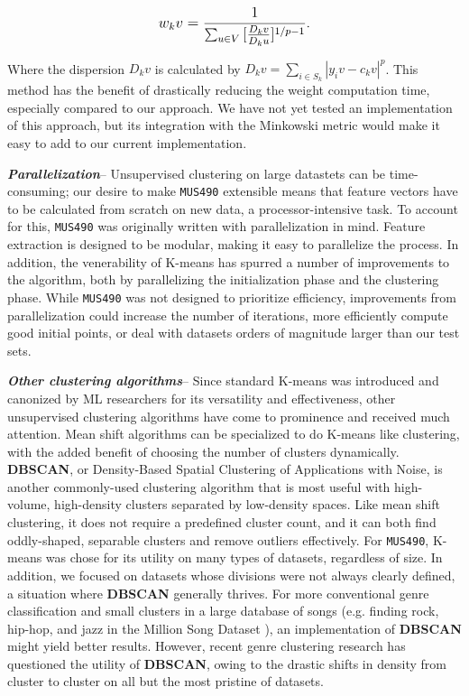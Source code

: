 \documentclass[12pt,twocolumn,titlepage]{article}
\begin{document}
\begin{equation}\label{}
\mathlarger{w_kv = \frac{1}{\sum_{u \in V}{}{[\frac{D_kv}{D_ku}]^{1 / p-1}}}}.
\end{equation}

Where the dispersion $D_kv$ is calculated by $D_kv = \sum_{i \in S_k}{}{|y_iv - c_kv|^p}$. This method has the benefit of drastically reducing the weight computation time, especially compared to our approach. We have not yet tested an implementation of this approach, but its integration with the Minkowski metric would make it easy to add to our current implementation.

\emph{\textbf{Parallelization}}-- Unsupervised clustering on large datastets can be time-consuming; our desire to make \texttt{MUS490} extensible means that feature vectors have to be calculated from scratch on new data, a processor-intensive task. To account for this, \texttt{MUS490} was originally written with parallelization in mind. Feature extraction is designed to be modular, making it easy to parallelize the process. In addition, the venerability of K-means has spurred a number of improvements to the algorithm, both by parallelizing the initialization phase \cite{KMeans++} and the clustering phase. \cite{ParallelK} While \texttt{MUS490} was not designed to prioritize efficiency, improvements from parallelization could increase the number of iterations, more efficiently compute good initial points, or deal with datasets orders of magnitude larger than our test sets.

\emph{\textbf{Other clustering algorithms}}-- Since standard K-means was introduced and canonized by ML researchers for its versatility and effectiveness, other unsupervised clustering algorithms have come to prominence and received much attention. Mean shift algorithms can be specialized to do K-means like clustering, with the added benefit of choosing the number of clusters dynamically. \cite{MeanShift} \textbf{DBSCAN}, or Density-Based Spatial Clustering of Applications with Noise, is another commonly-used clustering algorithm that is most useful with high-volume, high-density clusters separated by low-density spaces. Like mean shift clustering, it does not require a predefined cluster count, and it can both find oddly-shaped, separable clusters and remove outliers effectively.
For \texttt{MUS490}, K-means was chose for its utility on many types of datasets, regardless of size. In addition, we focused on datasets whose divisions were not always clearly defined, a situation where \textbf{DBSCAN} generally thrives. For more conventional genre classification and small clusters in a large database of songs (e.g. finding rock, hip-hop, and jazz in the Million Song Dataset \cite{Bertin-Mahieux2011}), an implementation of \textbf{DBSCAN} might yield better results. However, recent genre clustering research has questioned the utility of \textbf{DBSCAN}, owing to the drastic shifts in density from cluster to cluster on all but the most pristine of datasets. \cite{DBSCAN}
\end{document}
